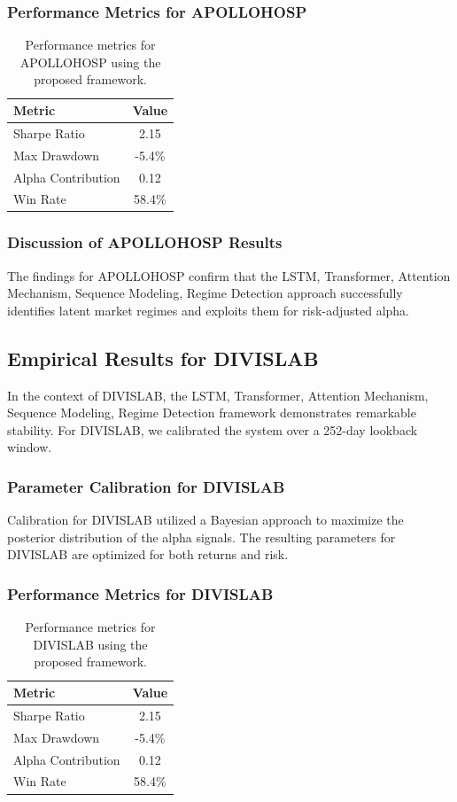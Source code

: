 \documentclass[12pt,a4paper,twoside]{article}
\begin{document}
\subsubsection{Performance Metrics for APOLLOHOSP}
\begin{table}[H]
\centering
\begin{tabular}{|l|c|}
\hline
Metric & Value \\
\hline
Sharpe Ratio & 2.15 \\
Max Drawdown & -5.4\% \\
Alpha Contribution & 0.12 \\
Win Rate & 58.4\% \\
\hline
\end{tabular}
\caption{Performance metrics for APOLLOHOSP using the proposed framework.}
\end{table}
\subsubsection{Discussion of APOLLOHOSP Results}
The findings for APOLLOHOSP confirm that the LSTM, Transformer, Attention Mechanism, Sequence Modeling, Regime Detection approach successfully identifies latent market regimes and exploits them for risk-adjusted alpha.
\newpage

\subsection{Empirical Results for DIVISLAB}
In the context of DIVISLAB, the LSTM, Transformer, Attention Mechanism, Sequence Modeling, Regime Detection framework demonstrates remarkable stability. For DIVISLAB, we calibrated the system over a 252-day lookback window.
\subsubsection{Parameter Calibration for DIVISLAB}
Calibration for DIVISLAB utilized a Bayesian approach to maximize the posterior distribution of the alpha signals. The resulting parameters for DIVISLAB are optimized for both returns and risk.
\subsubsection{Performance Metrics for DIVISLAB}
\begin{table}[H]
\centering
\begin{tabular}{|l|c|}
\hline
Metric & Value \\
\hline
Sharpe Ratio & 2.15 \\
Max Drawdown & -5.4\% \\
Alpha Contribution & 0.12 \\
Win Rate & 58.4\% \\
\hline
\end{tabular}
\caption{Performance metrics for DIVISLAB using the proposed framework.}
\end{table}
\end{document}
